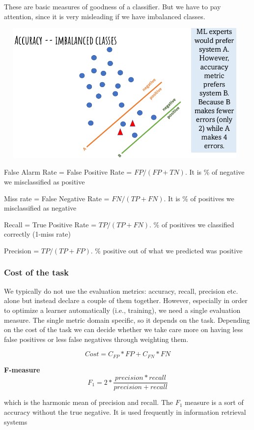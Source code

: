 \documentclass{article}
\begin{document}
These are basic measures of goodness of a classifier. But we have to pay attention, since it is very misleading if we have imbalanced classes.



\centering\includegraphics[width=13cm, height=7cm]{img/accuracy.png}	


\bigskip
\raggedright False Alarm Rate = False Positive Rate = \(FP / (FP+TN)\). It is \% of negative we misclassified as positive

Miss rate = False Negative Rate = \(FN / (TP+FN)\). It is \% of positives we misclassified as negative

Recall = True Positive Rate = \(TP / (TP+FN)\). \% of positives we classified correctly (1-miss rate)

Precision = \(TP / (TP+FP)\). \% positive out of what we predicted was positive



\subsubsection*{Cost of the task}

We typically do not use the evaluation metrics: accuracy, recall, precision etc. alone but instead declare a couple of them together. However, especially in order to optimize a learner automatically (i.e., training), we need a single evaluation measure. The single metric domain specific, so it depends on the task. Depending on the cost of the task we can decide whether we take care more on having less false positives or less false negatives through weighting them.

\[Cost = C_{FP} * FP + C_{FN} * FN\]


\textbf{F-measure}
\[F_1 = 2 * \dfrac{precision * recall}{precision + recall}\]

which is the harmonic mean of precision and recall. The \(F_1\) measure is a sort of accuracy without the true negative. It is used frequently in information retrieval systems
\end{document}
